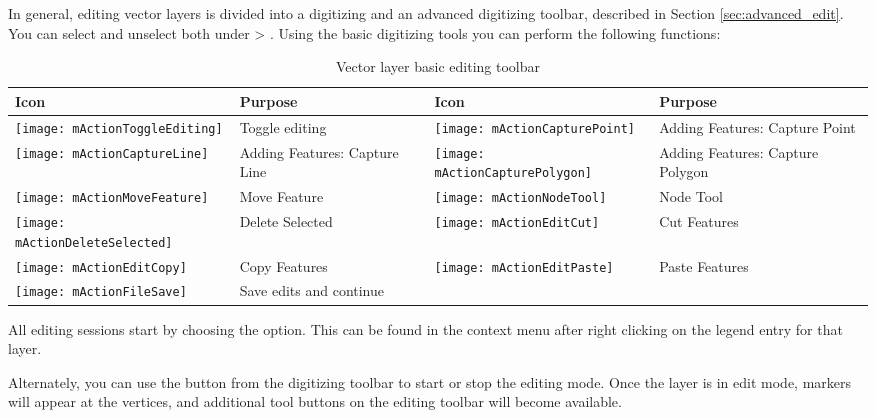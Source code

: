 In general, editing vector layers is divided into a digitizing and an advanced
digitizing toolbar, described in Section \ref{sec:advanced_edit}. You can
select and unselect both under  > .
Using the basic digitizing tools you can perform the following functions:

\begin{table}[ht]
\centering
\begin{tabular}{|l|p{5.5cm}|l|p{5.5cm}|}
\hline \textbf{Icon} & \textbf{Purpose} & \textbf{Icon} & \textbf{Purpose} \\
\hline \texttt{[image: mActionToggleEditing]}
   & Toggle editing
   & \texttt{[image: mActionCapturePoint]}
   & Adding Features: Capture Point \\
\hline \texttt{[image: mActionCaptureLine]}
   & Adding Features: Capture Line
   & \texttt{[image: mActionCapturePolygon]}
   & Adding Features: Capture Polygon \\
\hline \texttt{[image: mActionMoveFeature]}
   & Move Feature
   & \texttt{[image: mActionNodeTool]}
   & Node Tool \\
\hline \texttt{[image: mActionDeleteSelected]}
   & Delete Selected
   & \texttt{[image: mActionEditCut]}
   & Cut Features \\
\hline \texttt{[image: mActionEditCopy]}
   & Copy Features
   & \texttt{[image: mActionEditPaste]}
   & Paste Features \\
\hline \texttt{[image: mActionFileSave]}
   & Save edits and continue
   &  &  \\
\hline
\end{tabular}
\caption{Vector layer basic editing toolbar}\label{tab:vector_editing}\medskip
\end{table}

All editing sessions start by choosing the
 option.
This can be found in the context menu after right clicking on the legend
entry for that layer.

Alternately, you can use the 
 button from the digitizing
toolbar to start or stop the editing mode. Once the
layer is in edit mode, markers will appear at the vertices, and additional
tool buttons on the editing toolbar will become available.

